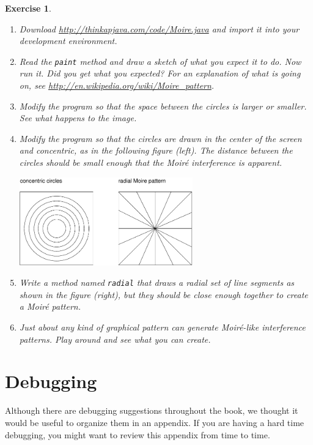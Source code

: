 \documentclass[12pt]{book}
\theoremstyle{exercise}
\newtheorem{exercise}{Exercise}[chapter]
\begin{document}
\begin{exercise}
\begin{enumerate}

\item Download
\url{http://thinkapjava.com/code/Moire.java} and import it into
your development environment.

\item Read the {\tt paint} method and draw a sketch of
what you expect it to do.  Now run it.  Did you get what you
expected?  For an explanation of what is going on, see
\url{http://en.wikipedia.org/wiki/Moire_pattern}.

\item Modify the program so that the space between the circles is
larger or smaller.  See what happens to the image.

\item Modify the program so that the circles are drawn in the center
of the screen and concentric, as in the following figure (left).
The distance between the circles should be small enough
that the Moir\'{e} interference is apparent.

\includegraphics[height=1.5in]{figs/moire.pdf}

\item Write a method named {\tt radial} that draws a radial set
of line segments as shown in the figure (right), but they should be close
enough together to create a Moir\'{e} pattern.

\item Just about any kind of graphical pattern can generate
Moir\'{e}-like interference patterns.  Play around and see what you
can create.

\end{enumerate}
\end{exercise}


\chapter{Debugging}
\label{debug}

Although there are debugging suggestions throughout the book, we thought it would be useful to organize them in an appendix.
If you are having a hard time debugging, you might want to review this appendix from time to time.
\end{document}
